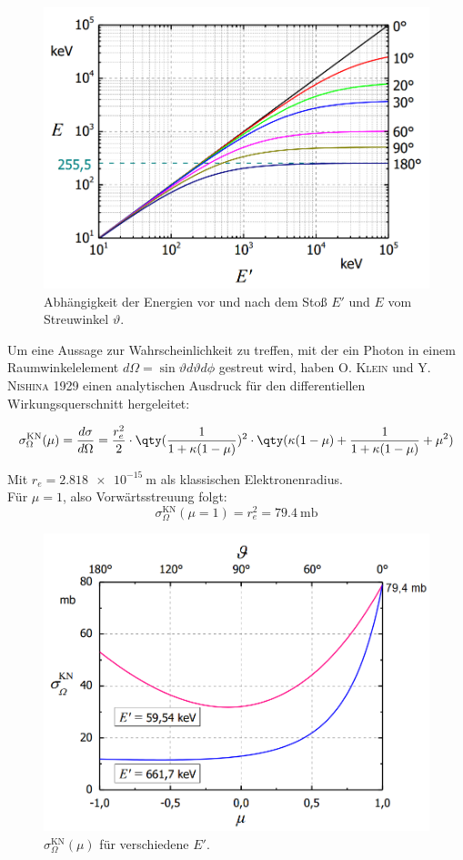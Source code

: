 \documentclass[slug=CS, room=Andreas-Schubert-Bau\,\ Labor\ 406,
supervisor=Juliane\ Volkmer, coursedate=29.\ 11.\ 2019]{../../Lab_Report_LaTeX/lab_report}
\begin{document}
\begin{figure}[H]\centering
        \includegraphics[width=.5\columnwidth]{./pictures/evontheta.png}
        \caption{Abhängigkeit der Energien vor und nach dem Stoß \(E'\) und \(E\) vom Streuwinkel
        \(\vartheta\).}
        \label{fig:evontheta}
\end{figure}

Um eine Aussage zur Wahrscheinlichkeit zu treffen, mit der ein Photon in einem Raumwinkelelement
\(d\Omega = \sin\vartheta d\vartheta d\phi\) gestreut wird, haben \textsc{O. Klein} und
\textsc{Y. Nishina} 1929 einen analytischen Ausdruck für den differentiellen Wirkungsquerschnitt
hergeleitet:

\begin{equation}\label{eq:kn}
        \sigma^{\text{KN}}_\Omega(\mu) = \frac{d\sigma}{d\Omega} = \frac{r_e^2}{2} \cdot \qty(\frac{1}{1 + \kappa(1 - \mu)})^2 \cdot \qty(\kappa(1 - \mu) + \frac{1}{1 + \kappa(1 - \mu)} + \mu^2)
\end{equation}

Mit \(r_e = \SI{2,818e-15}{\metre}\) als klassischen Elektronenradius.\\

Für \(\mu = 1\), also Vorwärtsstreuung folgt:
\begin{equation}\label{key}
        \sigma^{\text{KN}}_\Omega(\mu = 1) = r_e^2 = \SI{79,4}{\milli\barn}
\end{equation}

\begin{figure}[H]\centering
        \includegraphics[width=.5\columnwidth]{./pictures/sigma_kn.png}
        \caption{\(\sigma^{\text{KN}}_\Omega(\mu)\) für verschiedene \(E'\).}
        \label{fig:sigmakn}
\end{figure}
\end{document}
